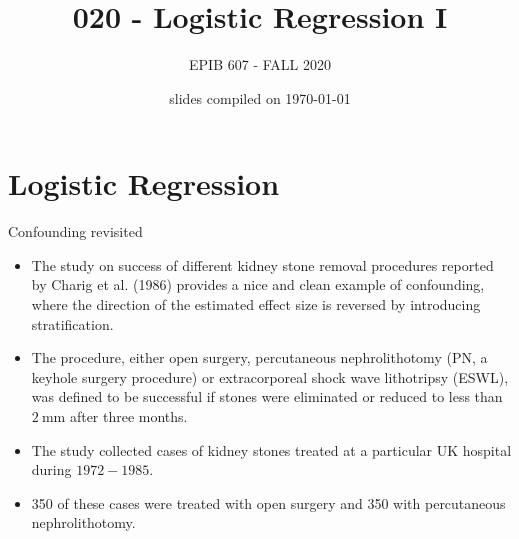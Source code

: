 \documentclass[10pt]{beamer}\usepackage[]{graphicx}\usepackage[]{color}
\begin{document}
	
	
	
	
	\title{020 - Logistic Regression I}
	\author{EPIB 607 - FALL 2020}
	
	\date{slides compiled on \today}
	
	\maketitle
	
	


\section{Logistic Regression}

\begin{frame}{Confounding revisited}

\begin{itemize}
	\item The study on success of different kidney stone removal procedures reported by Charig et al. (1986) provides a nice and clean example of confounding, where the direction of the estimated effect size is reversed by introducing stratification.
\item The procedure, either open surgery, percutaneous nephrolithotomy (PN, a keyhole surgery procedure) or extracorporeal shock wave lithotripsy (ESWL), was defined to be successful if stones were eliminated or reduced to less than $2 \mathrm{~mm}$ after three months.
\item The study collected cases of kidney stones treated at a particular UK hospital during $1972-1985$.
\item 350 of these cases were treated with open surgery and 350 with percutaneous nephrolithotomy.
\end{itemize}
\end{frame}
\end{document}

